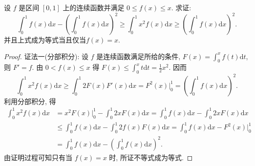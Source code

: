 \documentclass[../../main.tex]{subfiles}%
\begin{document}
\begin{example}
设 $f$ 是区间 $[0,1]$ 上的连续函数并满足 $0\leqslant  f(x)\leqslant  x$. 求证:
$$\int_0^1 f(x)\mathrm{d}x-\left(\int_0^1 f(x)\mathrm{d}x\right)^2\geqslant \int_0^1 x^2f(x)\mathrm{d}x\geqslant \left(\int_0^1 f(x)\mathrm{d}x\right)^2.$$
并且上式成为等式当且仅当$f(x)=x$.
\end{example}
\begin{proof}

{\color{blue}证法一(分部积分):}
设 $f$ 是连续函数满足所给的条件, $F(x)=\int_0^x f(t)\mathrm{d}t$, 则 $F'=f$. 由 $0<f(x)\leqslant  x$ 得 $F(x)\leqslant \int_0^x t\mathrm{d}t=\frac{1}{2}x^2$. 因而
$$\int_0^1 x^2f(x)\mathrm{d}x\geqslant \int_0^1 2F(x)F'(x)\mathrm{d}x=F^2(x)\bigg|_0^1=\left(\int_0^1 f(x)\mathrm{d}x\right)^2.$$
利用分部积分, 得
$$
\begin{aligned}
\int_0^1 x^2f(x)\mathrm{d}x &= x^2F(x)\bigg|_0^1-\int_0^1 2xF(x)\mathrm{d}x = \int_0^1 f(x)\mathrm{d}x-\int_0^1 2xF(x)\mathrm{d}x \\
&\leqslant  \int_0^1 f(x)\mathrm{d}x-\int_0^1 2f(x)F(x)\mathrm{d}x = \int_0^1 f(x)\mathrm{d}x-F^2(x)\bigg|_0^1 \\
&= \int_0^1 f(x)\mathrm{d}x-\left(\int_0^1 f(x)\mathrm{d}x\right)^2.
\end{aligned}
$$
由证明过程可知只有当 $f(x)=x$ 时, 所证不等式成为等式.


\end{proof}
\end{document}
